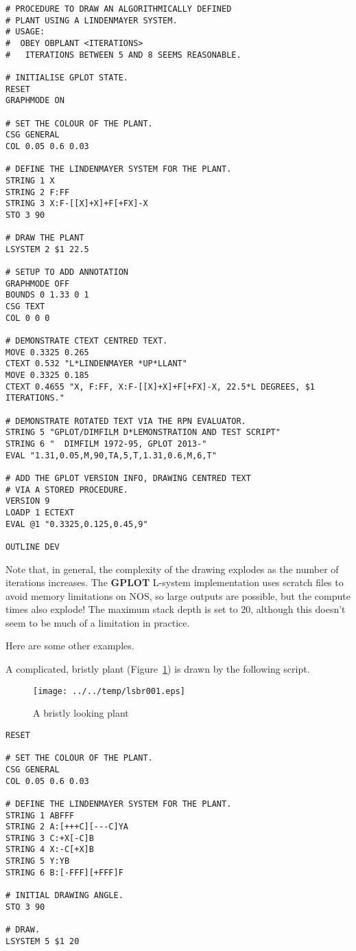 \documentclass[a4paper,twoside,11pt]{article}
\makeatletter
\def\maxwidth{%
  \ifdim\Gin@nat@width>\linewidth
    \linewidth
  \else
    \Gin@nat@width
  \fi
}
\newcommand{\newpara}{\par\vspace{4mm}\noindent}
\makeatother
\begin{document}
\begin{lstlisting}
# PROCEDURE TO DRAW AN ALGORITHMICALLY DEFINED
# PLANT USING A LINDENMAYER SYSTEM.
# USAGE:
#  OBEY OBPLANT <ITERATIONS>
#   ITERATIONS BETWEEN 5 AND 8 SEEMS REASONABLE.

# INITIALISE GPLOT STATE.
RESET
GRAPHMODE ON

# SET THE COLOUR OF THE PLANT.
CSG GENERAL
COL 0.05 0.6 0.03

# DEFINE THE LINDENMAYER SYSTEM FOR THE PLANT.
STRING 1 X
STRING 2 F:FF
STRING 3 X:F-[[X]+X]+F[+FX]-X 
STO 3 90

# DRAW THE PLANT
LSYSTEM 2 $1 22.5

# SETUP TO ADD ANNOTATION
GRAPHMODE OFF
BOUNDS 0 1.33 0 1
CSG TEXT
COL 0 0 0

# DEMONSTRATE CTEXT CENTRED TEXT.
MOVE 0.3325 0.265
CTEXT 0.532 "L*LINDENMAYER *UP*LLANT"
MOVE 0.3325 0.185
CTEXT 0.4655 "X, F:FF, X:F-[[X]+X]+F[+FX]-X, 22.5*L DEGREES, $1 ITERATIONS."

# DEMONSTRATE ROTATED TEXT VIA THE RPN EVALUATOR.
STRING 5 "GPLOT/DIMFILM D*LEMONSTRATION AND TEST SCRIPT"
STRING 6 "  DIMFILM 1972-95, GPLOT 2013-"
EVAL "1.31,0.05,M,90,TA,5,T,1.31,0.6,M,6,T"

# ADD THE GPLOT VERSION INFO, DRAWING CENTRED TEXT
# VIA A STORED PROCEDURE.
VERSION 9
LOADP 1 ECTEXT
EVAL @1 "0.3325,0.125,0.45,9"

OUTLINE DEV
\end{lstlisting}

\newpara
Note that, in general, the complexity of the drawing explodes as the
number of iterations increases. The \textbf{GPLOT} L-system implementation uses
scratch files to avoid memory limitations on NOS, so large outputs are
possible, but the compute times also explode! The maximum stack depth is
set to 20, although this doesn't seem to be much of a limitation in
practice.

\newpara
Here are some other examples.

\newpara
A complicated, bristly plant (Figure~\ref{fig:lsbr001}) is
drawn by the following script.

\begin{figure}
  \centering
  \texttt{[image: ../../temp/lsbr001.eps]}
  \caption{A bristly looking plant}
  \label{fig:lsbr001}
\end{figure}

\begin{lstlisting}
RESET

# SET THE COLOUR OF THE PLANT.
CSG GENERAL
COL 0.05 0.6 0.03

# DEFINE THE LINDENMAYER SYSTEM FOR THE PLANT.
STRING 1 ABFFF
STRING 2 A:[+++C][---C]YA
STRING 3 C:+X[-C]B
STRING 4 X:-C[+X]B
STRING 5 Y:YB
STRING 6 B:[-FFF][+FFF]F

# INITIAL DRAWING ANGLE.
STO 3 90

# DRAW.
LSYSTEM 5 $1 20
\end{lstlisting}
\end{document}
